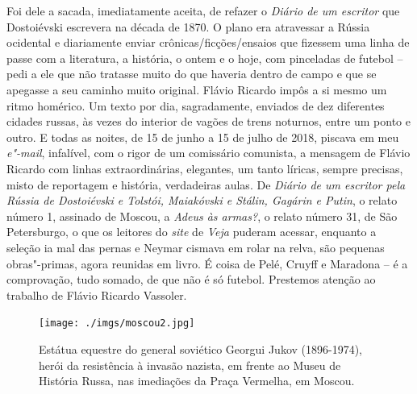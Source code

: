 Foi dele a sacada, imediatamente aceita, de refazer o \emph{Diário de um
escritor} que Dostoiévski escrevera na década de 1870. O plano era
atravessar a Rússia ocidental e diariamente enviar
crônicas/ficções/ensaios que fizessem uma linha de passe com a
literatura, a história, o ontem e o hoje, com pinceladas de futebol --
pedi a ele que não tratasse muito do que haveria dentro de campo e que
se apegasse a seu caminho muito original. Flávio Ricardo impôs a si
mesmo um ritmo homérico. Um texto por dia, sagradamente, enviados de dez
diferentes cidades russas, às vezes do interior de vagões de trens
noturnos, entre um ponto e outro. E todas as noites, de 15 de junho a 15
de julho de 2018, piscava em meu \emph{e"-mail}, infalível, com o rigor
de um comissário comunista, a mensagem de Flávio Ricardo com linhas
extraordinárias, elegantes, um tanto líricas, sempre precisas, misto de
reportagem e história, verdadeiras aulas. De \emph{Diário de um escritor
pela Rússia de Dostoiévski e Tolstói, Maiakóvski e Stálin, Gagárin e
Putin}, o relato número 1, assinado de Moscou, a \emph{Adeus às armas?},
o relato número 31, de São Petersburgo, o que os leitores do \emph{site}
de \emph{Veja} puderam acessar, enquanto a seleção ia mal das pernas e
Neymar cismava em rolar na relva, são pequenas obras"-primas, agora
reunidas em livro. É coisa de Pelé, Cruyff e Maradona -- é a
comprovação, tudo somado, de que não é só futebol. Prestemos atenção ao
trabalho de Flávio Ricardo Vassoler.



\movetoevenpage
\begin{absolutelynopagebreak}
\begin{vplace}
\begin{figure}[H]
\begin{adjustwidth}{-1.8cm}{}
  \vspace{2.7cm}
  \texttt{[image: ./imgs/moscou2.jpg]}  
\end{adjustwidth}
  \caption{Estátua equestre do general soviético Georgui Jukov (1896-1974), herói da resistência à invasão nazista, em frente ao Museu de História Russa, nas imediações da Praça Vermelha, em Moscou.}

\thispagestyle{empty}

\end{figure}
\end{vplace}

\end{absolutelynopagebreak}

